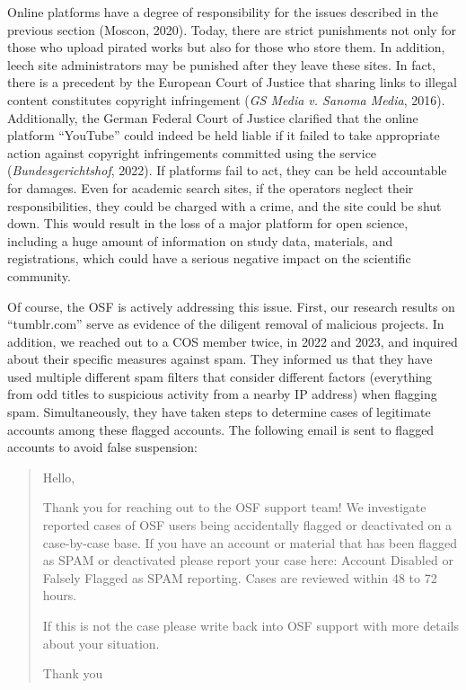 \documentclass[authordate, meta]{jote-new-article}
\begin{document}
	Online platforms have a degree of responsibility for the issues described in the previous section (Moscon, 2020). Today, there are strict punishments not only for those who upload pirated works but also for those who store them. In addition, leech site administrators may be punished after they leave these sites. In fact, there is a precedent by the European Court of Justice that sharing links to illegal content constitutes copyright infringement (\emph{GS Media v. Sanoma Media}, 2016). Additionally, the German Federal Court of Justice clarified that the online platform “YouTube” could indeed be held liable if it failed to take appropriate action against copyright infringements committed using the service (\emph{Bundesgerichtshof}, 2022). If platforms fail to act, they can be held accountable for damages. Even for academic search sites, if the operators neglect their responsibilities, they could be charged with a crime, and the site could be shut down. This would result in the loss of a major platform for open science, including a huge amount of information on study data, materials, and registrations, which could have a serious negative impact on the scientific community.



	Of course, the OSF is actively addressing this issue. First, our research results on “tumblr.com” serve as evidence of the diligent removal of malicious projects. In addition, we reached out to a COS member twice, in 2022 and 2023, and inquired about their specific measures against spam. They informed us that they have used multiple different spam filters that consider different factors (everything from odd titles to suspicious activity from a nearby IP address) when flagging spam. Simultaneously, they have taken steps to determine cases of legitimate accounts among these flagged accounts. The following email is sent to flagged accounts to avoid false suspension:


	\begin{quotation}
		
	Hello,



	Thank you for reaching out to the OSF support team! We investigate reported cases of OSF users being accidentally flagged or deactivated on a case-by-case base. If you have an account or material that has been flagged as SPAM or deactivated please report your case here: Account Disabled or Falsely Flagged as SPAM reporting. Cases are reviewed within 48 to 72 hours.







	If this is not the case please write back into OSF support with more details about your situation.



	Thank you
	\end{quotation}
\end{document}
